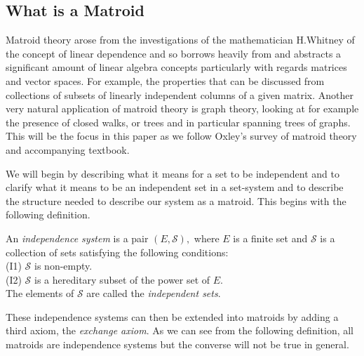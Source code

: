 \documentclass[../main.tex]{subfiles}
\begin{document}
\subsection{What is a Matroid}
Matroid theory arose from the investigations of the mathematician H.Whitney \cite{whitney} of the concept of linear dependence and so borrows heavily from and abstracts a significant amount of linear algebra concepts particularly with regards  matrices and vector spaces. For example, the properties that can be discussed from collections of subsets of linearly independent columns of a given  matrix. Another very natural application of matroid theory is graph theory, looking at for example the presence of closed walks, or trees and in particular spanning trees of graphs. This will be the focus in this paper as we follow Oxley's survey of matroid theory\cite{ox_paper} and accompanying textbook.\cite{ox_book}\\ 

\vspace{1mm}

We will begin by describing what it means for a set to be independent and to clarify what it means to be an independent set in a set-system and to describe the structure needed to describe our system as a matroid. This begins with the following definition.

\begin{defn}
An \textit{independence system} is a pair $(E,\mathcal{S}),$ where $E$ is a finite set and $\mathcal{S}$ is a collection of sets satisfying the following conditions:\\
\noindent (I1) $\mathcal{S}$ is non-empty.\\
\noindent (I2) $\mathcal{S}$ is a  hereditary subset of the power set of $E$.\\
\noindent The elements of $\mathcal{S}$ are called the \textit{independent sets}.
\end{defn}

\noindent These independence systems can then be extended into matroids by adding a third axiom, the \textit{exchange axiom}. As we can see from the following definition, all matroids are independence systems but the converse will not be true in general.
\end{document}
